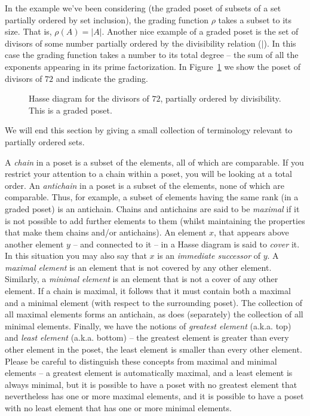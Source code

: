 In the example we've been considering (the graded poset of subsets of a set
partially ordered by set inclusion), the grading function $\rho$ takes a
subset to its size.  That is, $\rho(A) = |A|$.  Another nice example of
a graded poset is the set of divisors of some number partially ordered
by the divisibility relation ($\mid$).  In this case the grading function
takes a number to its total degree -- the sum of all the exponents
appearing in its prime factorization.  In Figure~\ref{fig:divisors_of_72}
we show the poset of divisors of $72$ and indicate the grading.

\begin{figure}[!hbtp]

\caption[Hasse diagram of divisors of 72.]{Hasse %
diagram for the divisors of $72$, partially ordered by %
divisibility. This is a graded poset.}
\label{fig:divisors_of_72} 
\end{figure}

We will end this section by giving a small collection of terminology
relevant to partially ordered sets.

A \emph{chain} in a poset is a subset of the elements, all 
of which are comparable.  If you restrict your attention to a chain within 
a poset, you will be looking at a total order.  
An \emph{antichain} in a poset is a subset
of the elements, none of which are comparable.  Thus, for example, a subset
of elements having the same rank (in a graded poset) is an antichain.  
Chains and antichains are said to be \emph{maximal} if it
is not possible to add further elements to them (whilst maintaining the 
properties that make them chains and/or antichains).  An element $x$, that 
appears above another element $y$ -- and connected to it -- in a Hasse
diagram is said to \emph{cover} it.  In this situation
you may also say that $x$ is an \emph{immediate successor} of
$y$.  A \emph{maximal element} is an element that is not covered by any other element.  Similarly, a 
\emph{minimal element} is an element that is not a cover of any other element.  If a chain is maximal, it follows that it
must contain both a maximal and a minimal element (with respect to the
surrounding poset).  The collection of all maximal elements forms an antichain,
as does (separately) the collection of all minimal elements.  Finally,
we have the notions of  
\emph{greatest element} (a.k.a. top) and 
\emph{least element} (a.k.a. 
bottom) -- the greatest element is greater than every
other element in the poset,  the least element is smaller than every other element.  Please be careful to distinguish these
concepts from maximal and minimal elements -- a greatest element is 
automatically maximal, and a least element is always minimal, but it 
is possible to have a poset with no greatest element that nevertheless 
has one or more maximal elements, and it is possible to have a poset with no
least element that has one or more minimal elements. 

